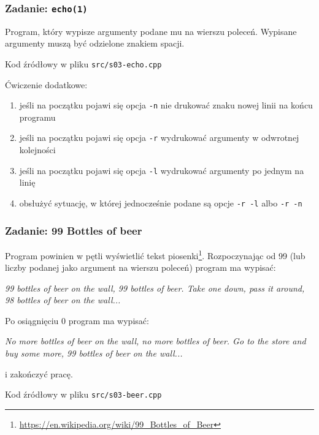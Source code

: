 \documentclass[aspectratio=169]{beamer}
\begin{document}
\begin{frame}[fragile]
    \frametitle{Zadanie: {\tt echo(1)}}
    \label{lecture_exercise_4}

    Program, który wypisze argumenty podane mu na wierszu poleceń. Wypisane
    argumenty muszą być odzielone znakiem spacji.

    Kod źródłowy w pliku {\tt src/s03-echo.cpp}

    \vspace{1em}

    {\small
    Ćwiczenie dodatkowe:
    \begin{enumerate}
        \item jeśli na początku pojawi się opcja {\tt -n} nie drukować znaku
            nowej linii na końcu programu
        \item jeśli na początku pojawi się opcja {\tt -r} wydrukować
            argumenty w odwrotnej kolejności
        \item jeśli na początku pojawi się opcja {\tt -l} wydrukować argumenty
            po jednym na linię
        \item obsłużyć sytuację, w której jednocześnie podane są opcje {\tt -r
            -l} albo {\tt -r -n}
    \end{enumerate}}
\end{frame}

\begin{frame}[fragile]
    \frametitle{Zadanie: 99 Bottles of beer}
    \label{lecture_exercise_5}

    Program powinien w pętli wyświetlić tekst
    piosenki\footnote{\url{https://en.wikipedia.org/wiki/99_Bottles_of_Beer}}.
    Rozpoczynając od 99 (lub liczby podanej jako argument na wierszu poleceń)
    program ma wypisać:

    \emph{99 bottles of beer on the wall, 99 bottles of beer.\newline
    Take one down, pass it around, 98 bottles of beer on the wall...}

    \vspace{1em}

    Po osiągnięciu 0 program ma wypisać:

    \emph{No more bottles of beer on the wall, no more bottles of beer.\newline
    Go to the store and buy some more, 99 bottles of beer on the wall...}

    i zakończyć pracę.

    \vspace{1em}

    Kod źródłowy w pliku {\tt src/s03-beer.cpp}
\end{frame}
\end{document}
